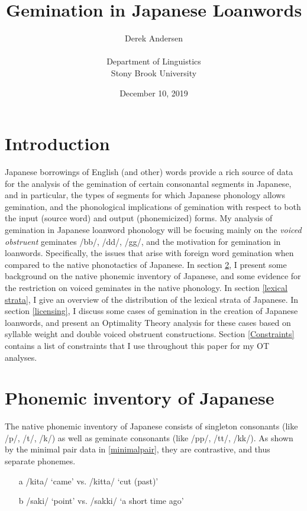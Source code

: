 \documentclass{article}
\title{Gemination in Japanese Loanwords}
\author{Derek Andersen \\ \\
        Department of Linguistics \\
		Stony Brook University}
\date{December 10, 2019}
\begin{document}
\maketitle


\section{Introduction}

Japanese borrowings of English (and other) words provide a rich source of data for the analysis of the gemination of certain consonantal segments in Japanese, and in  particular, the types of segments for which Japanese phonology allows gemination, and the phonological  implications of gemination with respect to both the input (source word) and output (phonemicized) forms. My analysis of gemination in Japanese loanword phonology will be focusing mainly on the \textit{voiced obstruent} geminates /bb/, /dd/, /gg/, and the motivation for gemination in loanwords. Specifically, the issues that arise with foreign word gemination when compared to the native phonotactics of Japanese. In section \ref{phonemic}, I  present some background on the native phonemic inventory of Japanese, and some evidence for the restriction on voiced geminates in the native phonology. In section \ref{lexical strata}, I give an overview of the distribution of the lexical strata of Japanese. In section \ref{licensing}, I discuss some cases of gemination in the creation of Japanese loanwords, and present an Optimality Theory \citep{PrinceSmolensky1993} analysis for these cases based on syllable weight and double voiced obstruent constructions. Section \ref{Constraints} contains a list of constraints that I use throughout this paper for my OT analyses.


\section{Phonemic inventory of Japanese}
\label{phonemic}

The native phonemic inventory of Japanese consists of singleton consonants (like /p/, /t/, /k/) as well as geminate consonants (like /pp/, /tt/, /kk/). As shown by the minimal pair data in \ref{minimalpair}, they are contrastive, and thus separate phonemes. \citep[p. 2]{Kubozono2009} 

\begin{exe}
    \ex
    \label{minimalpair}
    \begin{itemize}
        \item [a] /kita/ ‘came' vs. /kitta/ ‘cut (past)'
        \item [b] /saki/ ‘point' vs. /sakki/ ‘a short time ago'
    \end{itemize}
    
\end{exe}
\end{document}
